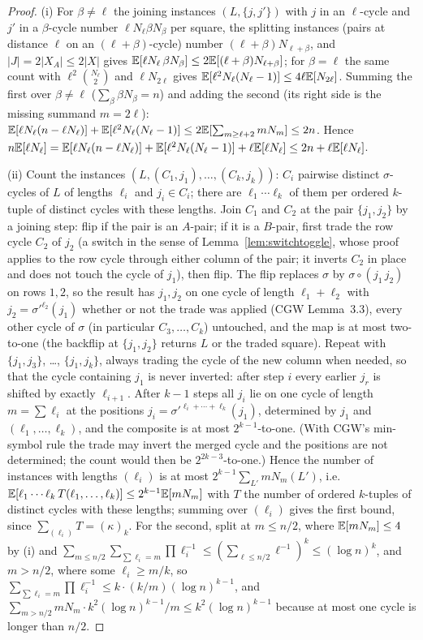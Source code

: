 \begin{proof}
(i) For $\beta\ne\ell$ the joining instances $(L,\{j,j'\})$ with $j$ in
an $\ell$-cycle and $j'$ in a $\beta$-cycle number $\ell N_\ell\beta N_\beta$
per square, the splitting instances (pairs at distance $\ell$ on an
$(\ell+\beta)$-cycle) number $(\ell+\beta)N_{\ell+\beta}$, and
$|J|=2|X_A|\le2|X|$ gives
$\mathbb{E}[\ell N_\ell\,\beta N_\beta]\le2\mathbb{E}[(\ell+\beta)N_{\ell+\beta}]$; for
$\beta=\ell$ the same count with $\ell^2\binom{N_\ell}{2}$ and
$\ell N_{2\ell}$ gives $\mathbb{E}[\ell^2N_\ell(N_\ell-1)]\le4\ell\mathbb{E}[N_{2\ell}]$.
Summing the first over $\beta\ne\ell$ ($\sum_\beta\beta N_\beta=n$) and
adding the second (its right side is the missing summand $m=2\ell$):
$\mathbb{E}[\ell N_\ell(n-\ell N_\ell)]+\mathbb{E}[\ell^2N_\ell(N_\ell-1)]\le2\mathbb{E}[\sum_{m\ge\ell+2}mN_m]\le2n$.  Hence
$n\mathbb{E}[\ell N_\ell]=\mathbb{E}[\ell N_\ell(n-\ell N_\ell)]+\mathbb{E}[\ell^2N_\ell(N_\ell-1)]+\ell\mathbb{E}[\ell N_\ell]
\le2n+\ell\mathbb{E}[\ell N_\ell]$.

(ii) Count the instances $(L,(C_1,j_1),\dots,(C_k,j_k))$: $C_i$
pairwise distinct $\sigma$-cycles of $L$ of lengths $\ell_i$ and
$j_i\in C_i$; there are $\ell_1\cdots\ell_k$ of them per ordered
$k$-tuple of distinct cycles with these lengths.  Join $C_1$ and $C_2$
at the pair $\{j_1,j_2\}$ by a joining step: flip if the pair is an
$A$-pair; if it is a $B$-pair, first trade the row cycle $C_2$ of $j_2$
(a switch in the sense of Lemma~\ref{lem:switchtoggle}, whose proof
applies to the row cycle through either column of the pair; it inverts
$C_2$ in place and does not touch the cycle of $j_1$), then flip.  The
flip replaces $\sigma$ by $\sigma\circ(j_1\,j_2)$ on rows $1,2$, so
the result has $j_1,j_2$ on one cycle of length $\ell_1+\ell_2$ with
$j_2=\sigma'^{\ell_2}(j_1)$ whether or not the trade was applied
(CGW Lemma~3.3), every other cycle of $\sigma$ (in particular
$C_3,\dots,C_k$) untouched, and the map is at most two-to-one (the
backflip at $\{j_1,j_2\}$ returns $L$ or the traded square).  Repeat
with $\{j_1,j_3\}$, \dots, $\{j_1,j_k\}$, always trading the cycle of
the new column when needed, so that the cycle containing $j_1$ is never
inverted: after step $i$ every earlier $j_r$ is shifted by exactly
$\ell_{i+1}$.  After $k-1$ steps all $j_i$ lie on one cycle of length
$m=\sum\ell_i$ at the positions $j_i=\sigma'^{\ell_i+\cdots+\ell_k}(j_1)$,
determined by $j_1$ and $(\ell_1,\dots,\ell_k)$, and the composite is at
most $2^{k-1}$-to-one.  (With CGW's min-symbol rule the trade may
invert the merged cycle and the positions are not determined; the
count would then be $2^{2k-3}$-to-one.)  Hence the number of instances with lengths
$(\ell_i)$ is at most $2^{k-1}\sum_{L'}mN_m(L')$, i.e.\
$\mathbb{E}[\ell_1\cdots\ell_k\,T(\ell_1,\dots,\ell_k)]\le2^{k-1}\mathbb{E}[mN_m]$ with
$T$ the number of ordered $k$-tuples of distinct cycles with these
lengths; summing over $(\ell_i)$ gives the first bound, since
$\sum_{(\ell_i)}T=(\kappa)_k$.  For the second, split at $m\le n/2$,
where $\mathbb{E}[mN_m]\le4$ by (i) and
$\sum_{m\le n/2}\sum_{\sum\ell_i=m}\prod\ell_i^{-1}\le(\sum_{\ell\le n/2}\ell^{-1})^k\le(\log n)^k$,
and $m>n/2$, where some $\ell_i\ge m/k$, so
$\sum_{\sum\ell_i=m}\prod\ell_i^{-1}\le k\cdot(k/m)(\log n)^{k-1}$, and
$\sum_{m>n/2}mN_m\cdot k^2(\log n)^{k-1}/m\le k^2(\log n)^{k-1}$ because at
most one cycle is longer than $n/2$.


\end{proof}

